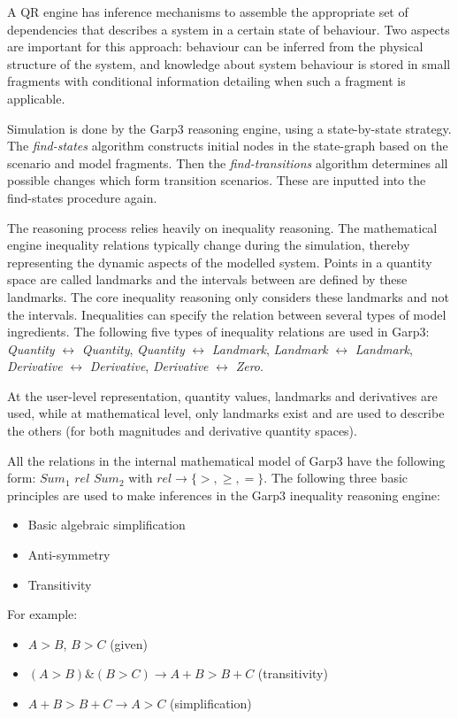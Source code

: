 \documentclass{article} %
\begin{document}
A QR engine has inference mechanisms to assemble the appropriate set of
dependencies that describes a system in a certain state of behaviour. Two
aspects are important for this approach: behaviour can be inferred from the
physical structure of the system, and knowledge about system behaviour is
stored in small fragments with conditional information detailing when such a
fragment is applicable.

\vspace{0.8em}

Simulation is done by the Garp3 reasoning engine, using a state-by-state
strategy. The \emph{find-states} algorithm constructs initial nodes in the 
state-graph based on the scenario and model fragments. Then the 
\emph{find-transitions} algorithm determines all possible changes which form 
transition scenarios. These are inputted into the find-states procedure again.  

The reasoning process relies heavily on inequality reasoning.
The mathematical engine inequality relations typically change during the 
simulation, thereby representing the dynamic aspects of the modelled system. 
Points in a quantity 
space are called landmarks and the intervals between are defined by these
landmarks. The core inequality reasoning only considers these landmarks and not
the intervals. Inequalities can specify the relation between several types of
model ingredients. The following five types of inequality relations are used in
Garp3: \emph{Quantity} $\leftrightarrow$ \emph{Quantity}, \emph{Quantity} 
$\leftrightarrow$ \emph{Landmark}, \emph{Landmark} $\leftrightarrow$ 
\emph{Landmark}, \emph{Derivative} $\leftrightarrow$ \emph{Derivative}, 
\emph{Derivative} $\leftrightarrow$ \emph{Zero}.  

At the user-level representation, quantity values, landmarks and derivatives are
used, while at mathematical level, only landmarks exist and are used to
describe the others (for both magnitudes and derivative quantity spaces).


All the relations in the internal mathematical model of Garp3 have the
following form: $Sum_1$ $rel$ $Sum_2$ with $rel \rightarrow \{>,\ge,=\}$. The following
three basic principles are used to make inferences in the Garp3 inequality
reasoning engine:

\begin{itemize}
\item Basic algebraic simplification
\item Anti-symmetry
\item Transitivity
\end{itemize}
For example:
\begin{itemize}
\item $A>B$, $B>C$ (given)
\item $(A>B)\&(B>C) \rightarrow A+B>B+C$ (transitivity)
\item $A+B>B+C \rightarrow A>C$ (simplification)
\end{itemize}
\end{document}
